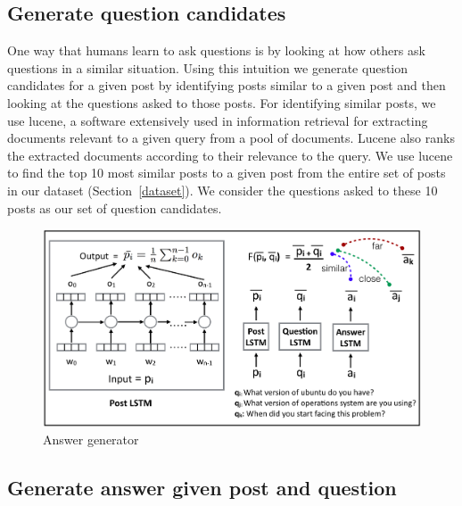 \documentclass[11pt]{article}
\begin{document}


\subsection{Generate question candidates}\label{candidate_question_generator}

One way that humans learn to ask questions is by looking at how others ask questions in a similar situation. Using this intuition we generate question candidates for a given post by identifying posts similar to a given post and then looking at the questions asked to those posts. For identifying similar posts, we use lucene, a software extensively used in information retrieval for extracting documents relevant to a given query from a pool of documents. Lucene also ranks the extracted documents according to their relevance to the query. We use lucene to find the top 10 most similar posts to a given post from the entire set of posts in our dataset (Section~\ref{dataset}). We consider the questions asked to these 10 posts as our set of question candidates. 

\begin{figure}[!t]
\centering
\includegraphics[scale=0.33]{answer_generator}
\caption{Answer generator}
\label{answer_generator}
\end{figure}

\subsection{Generate answer given post and question}\label{answer_generator}
\end{document}
